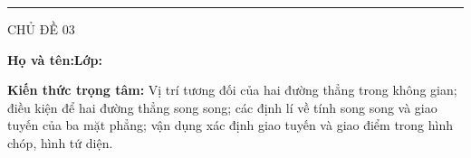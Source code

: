 \documentclass[11pt,a4paper]{article}
\newcommand{\sectitle}[2]{\vspace{4pt}\noindent{\large\bfseries\textcolor{questionpurple}{#1.\ #2}}\par\vspace{3pt}}
\begin{document}
\noindent
\begin{minipage}[t]{.35\linewidth}
  \vspace{2pt}\rule{.73\linewidth}{.4pt}\par\vspace{3pt}
  CHỦ ĐỀ 03\par\vspace{3pt}{\itshape TÀI LIỆU HỌC TẬP -- BÀI 08\par}
\end{minipage}\hfill
\begin{minipage}[t]{.62\linewidth}
  \vspace{4pt}{\small\bfseries VẤN ĐỀ 11X32\par
  HAI ĐƯỜNG THẲNG SONG SONG\par}
\end{minipage}

\vspace{4mm}
\noindent\textbf{Họ và tên:}\dotfill\hfill\textbf{Lớp:}\enspace\dotfill
\vspace{2mm}

\begin{theorybox}
\textbf{Kiến thức trọng tâm:} Vị trí tương đối của hai đường thẳng trong
không gian; điều kiện để hai đường thẳng song song; các định lí về tính
song song và giao tuyến của ba mặt phẳng; vận dụng xác định giao tuyến
và giao điểm trong hình chóp, hình tứ diện.
\end{theorybox}

\sectitle{1}{Vị trí tương đối của hai đường thẳng}
\end{document}
